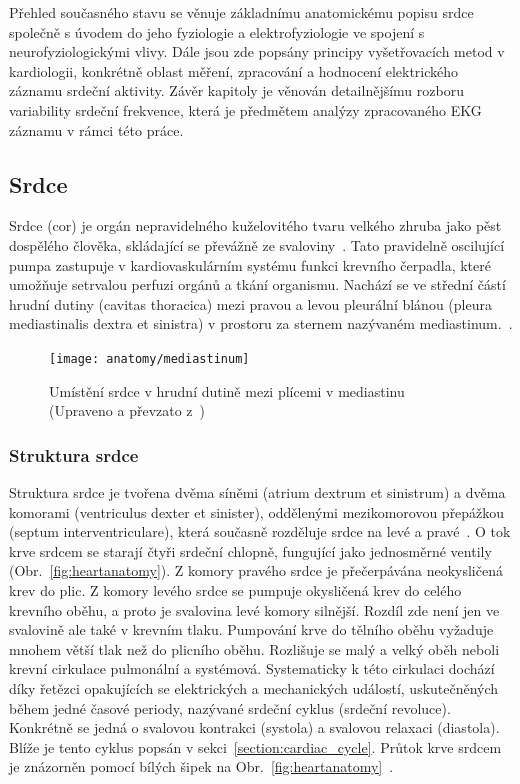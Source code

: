 Přehled současného stavu se věnuje základnímu anatomickému popisu srdce společně
s úvodem do jeho fyziologie a elektrofyziologie ve spojení s neurofyziologickými
vlivy. Dále jsou zde popsány principy vyšetřovacích metod v kardiologii,
konkrétně oblast měření, zpracování a hodnocení elektrického záznamu srdeční
aktivity. Závěr kapitoly je věnován detailnějšímu rozboru variability srdeční
frekvence, která je předmětem analýzy zpracovaného EKG záznamu v rámci této
práce.

\subsection{Srdce}
\label{section:heart}
Srdce (cor) je orgán nepravidelného kuželovitého tvaru velkého zhruba jako pěst
dospělého člověka, skládající se převážně ze svaloviny~\cite{Memorix2017}. Tato
pravidelně oscilující pumpa zastupuje v kardiovaskulárním systému funkci
krevního čerpadla, které umožňuje setrvalou perfuzi orgánů a tkání organismu.
Nachází se ve střední částí hrudní dutiny (cavitas thoracica) mezi pravou a
levou pleurální blánou (pleura mediastinalis dextra et sinistra) v prostoru za
sternem nazývaném mediastinum.~\cite{Weinhaus2005}.

\begin{figure}[h]
	\begin{center}
		\texttt{[image: anatomy/mediastinum]}
		\caption{Umístění srdce v hrudní dutině mezi plícemi v mediastinu
			(Upraveno a převzato z~\cite{OpenStax})}
		\label{fig:mediastinum}
	\end{center}
\end{figure}

\subsubsection{Struktura srdce}
\label{section:heart_structure}
Struktura srdce je tvořena dvěma síněmi (atrium dextrum et sinistrum) a dvěma
komorami (ventriculus dexter et sinister), oddělenými mezikomorovou přepážkou
(septum interventriculare), která současně rozděluje srdce na levé a
pravé~\cite{Memorix2017}. O tok krve srdcem se starají čtyři srdeční chlopně,
fungující jako jednosměrné ventily (Obr.~\ref{fig:heartanatomy}). Z komory
pravého srdce je přečerpávána neokysličená krev do plic. Z komory levého srdce
se pumpuje okysličená krev do celého krevního oběhu, a proto je svalovina levé
komory silnější. Rozdíl zde není jen ve svalovině ale také v krevním tlaku.
Pumpování krve do tělního oběhu vyžaduje mnohem větší tlak než do plicního
oběhu. Rozlišuje se malý a velký oběh neboli krevní cirkulace pulmonální a
systémová. Systematicky k této cirkulaci dochází díky řetězci opakujících se
elektrických a mechanických událostí, uskutečněných během jedné časové periody,
nazývané srdeční cyklus (srdeční revoluce). Konkrétně se jedná o svalovou
kontrakci (systola) a svalovou relaxaci (diastola). Blíže je tento cyklus popsán
v sekci~\ref{section:cardiac_cycle}. Průtok krve srdcem je znázorněn pomocí
bílých šipek na Obr.~\ref{fig:heartanatomy}~\cite{Stejfa2006}.

